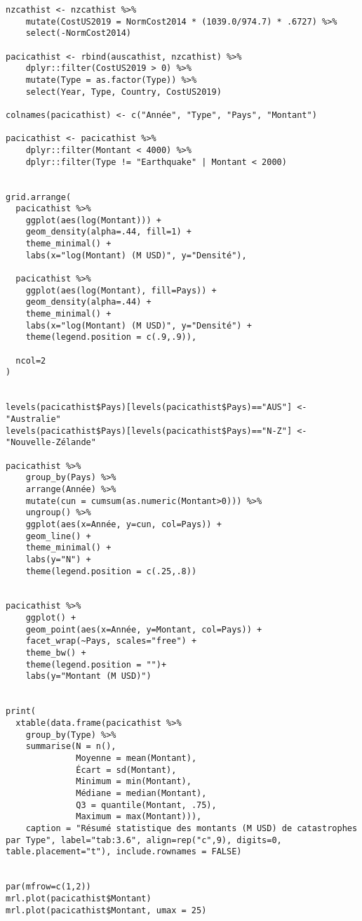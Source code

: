 \begin{lstlisting}
nzcathist <- nzcathist %>%
    mutate(CostUS2019 = NormCost2014 * (1039.0/974.7) * .6727) %>%
    select(-NormCost2014)

pacicathist <- rbind(auscathist, nzcathist) %>%
    dplyr::filter(CostUS2019 > 0) %>%
    mutate(Type = as.factor(Type)) %>%
    select(Year, Type, Country, CostUS2019)

colnames(pacicathist) <- c("Année", "Type", "Pays", "Montant")

pacicathist <- pacicathist %>% 
    dplyr::filter(Montant < 4000) %>% 
    dplyr::filter(Type != "Earthquake" | Montant < 2000)


grid.arrange(
  pacicathist %>%
    ggplot(aes(log(Montant))) +
    geom_density(alpha=.44, fill=1) +
    theme_minimal() +
    labs(x="log(Montant) (M USD)", y="Densité"),

  pacicathist %>% 
    ggplot(aes(log(Montant), fill=Pays)) + 
    geom_density(alpha=.44) + 
    theme_minimal() +
    labs(x="log(Montant) (M USD)", y="Densité") + 
    theme(legend.position = c(.9,.9)),
  
  ncol=2
)
  

levels(pacicathist$Pays)[levels(pacicathist$Pays)=="AUS"] <- "Australie"
levels(pacicathist$Pays)[levels(pacicathist$Pays)=="N-Z"] <- "Nouvelle-Zélande"

pacicathist %>% 
    group_by(Pays) %>%
    arrange(Année) %>% 
    mutate(cun = cumsum(as.numeric(Montant>0))) %>% 
    ungroup() %>% 
    ggplot(aes(x=Année, y=cun, col=Pays)) + 
    geom_line() +
    theme_minimal() +
    labs(y="N") + 
    theme(legend.position = c(.25,.8))
    
    
pacicathist %>% 
    ggplot() +
    geom_point(aes(x=Année, y=Montant, col=Pays)) + 
    facet_wrap(~Pays, scales="free") + 
    theme_bw() +
    theme(legend.position = "")+
    labs(y="Montant (M USD)")
    

print(
  xtable(data.frame(pacicathist %>% 
    group_by(Type) %>% 
    summarise(N = n(),
              Moyenne = mean(Montant),
              Écart = sd(Montant), 
              Minimum = min(Montant),
              Médiane = median(Montant),
              Q3 = quantile(Montant, .75),
              Maximum = max(Montant))), 
    caption = "Résumé statistique des montants (M USD) de catastrophes par Type", label="tab:3.6", align=rep("c",9), digits=0, table.placement="t"), include.rownames = FALSE)    


par(mfrow=c(1,2))
mrl.plot(pacicathist$Montant)
mrl.plot(pacicathist$Montant, umax = 25)



\end{lstlisting}

